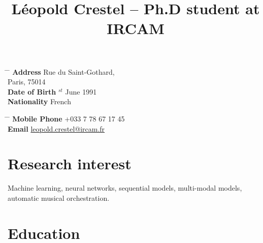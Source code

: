 \documentclass[10pt]{article} %
\begin{document}

\title{Léopold Crestel -- Ph.D student at IRCAM} %


\parbox{0.5\textwidth}{ %
\begin{tabbing} %
\hspace{3cm} \= \hspace{4cm} \= \kill %
{\bf Address}  Rue du Saint-Gothard,\\ %
\> Paris, 75014\\ %
{\bf Date of Birth} $^{st}$ June 1991\\ %
{\bf Nationality} \> French%
\end{tabbing}}
\hfill %
\parbox{0.5\textwidth}{ %
\begin{tabbing} %
\hspace{3cm} \= \hspace{4cm} \= \kill %
{\bf Mobile Phone} \> +033 7 78 67 17 45\\ %
{\bf Email} \> \href{mailto:leopold.crestel@ircam.fr}{leopold.crestel@ircam.fr} \\ %
\end{tabbing}}


\section{Research interest}
Machine learning, neural networks, sequential models, multi-modal models, automatic musical orchestration.

\section{Education}
\end{document}
